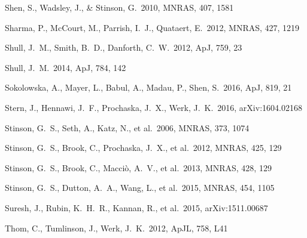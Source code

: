 \documentclass[useAMS,usenatbib]{mn2e}
\def \apj {ApJ}
\def \apjl {ApJL}
\def \mnras {MNRAS}
\begin{document}
\begin{thebibliography}{}
  
 Shen, S., Wadsley, J., 
\& Stinson, G.\ 2010, \mnras, 407, 1581 

Sharma, P., McCourt, M., Parrish, I.~J., Quataert, E.\ 2012, \mnras, 427, 1219

Shull, J.~M., Smith, B.~D., Danforth, C.~W.\ 2012, \apj, 759, 23

%
 Shull, J.~M.\ 2014, \apj, 784, 142

Sokolowska, A., Mayer, L., Babul, A., Madau, P., Shen, S.\ 2016, \apj, 819, 21

Stern, J., Hennawi, J.~F., Prochaska, J.~X., Werk, J.~K.\ 2016, arXiv:1604.02168

 Stinson, G.~S., Seth, A., Katz, N., et al.\ 2006, \mnras, 373, 1074

%
 Stinson, G.~S., Brook, C., Prochaska, J.~X., et al.\ 2012, \mnras, 425, 129

 Stinson, G.~S., Brook, 
C., Macci{\`o}, A.~V., et al.\ 2013, \mnras, 428, 129 

 Stinson, G.~S., Dutton, A.~A., Wang, L., et al.\ 2015, \mnras, 454, 1105 

%
 Suresh, J., Rubin, K.~H.~R., Kannan, R., et al.\ 2015, arXiv:1511.00687


Thom, C., Tumlinson, J., Werk, J.~K.\ 2012, \apjl, 758, L41


\end{thebibliography}
\end{document}
